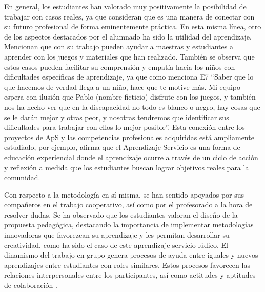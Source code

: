 \documentclass[spanish]{textolivre}
\begin{document}
En general, los estudiantes han valorado muy positivamente la posibilidad de trabajar con casos reales, ya que consideran que es una manera de conectar con su futuro profesional de forma eminentemente práctica. En esta misma línea, otro de los aspectos destacados por el alumnado ha sido la utilidad del aprendizaje. Mencionan que con su trabajo pueden ayudar a maestras y estudiantes a aprender con los juegos y materiales que han realizado. También se observa que estos casos pueden facilitar su comprensión y empatía hacia los niños con dificultades específicas de aprendizaje, ya que como menciona E7 “Saber que lo que hacemos de verdad llega a un niño, hace que te motive más. Mi equipo espera con ilusión que Pablo (nombre ficticio) disfrute con los juegos, y también nos ha hecho ver que en la discapacidad no todo es blanco o negro, hay cosas que se le darán mejor y otras peor, y nosotras tendremos que identificar sus dificultades para trabajar con ellos lo mejor posible”. Esta conexión entre los proyectos de ApS y las competencias profesionales adquiridas está ampliamente estudiado, por ejemplo, \textcite{jacoby_service-learning_2015} afirma que el Aprendizaje-Servicio es una forma de educación experiencial donde el aprendizaje ocurre a través de un ciclo de acción y reflexión a medida que los estudiantes buscan lograr objetivos reales para la comunidad.

Con respecto a la metodología en sí misma, se han sentido apoyados por sus compañeros en el trabajo cooperativo, así como por el profesorado a la hora de resolver dudas. Se ha observado que los estudiantes valoran el diseño de la propuesta pedagógica, destacando la importancia de implementar metodologías innovadoras que favorezcan su aprendizaje y les permitan desarrollar su creatividad, como ha sido el caso de este aprendizaje-servicio lúdico. El dinamismo del trabajo en grupo genera procesos de ayuda entre iguales y nuevos aprendizajes entre estudiantes con roles similares. Estos procesos favorecen las relaciones interpersonales entre los participantes, así como actitudes y aptitudes de colaboración \cite{claes_community_2021}.
\end{document}
